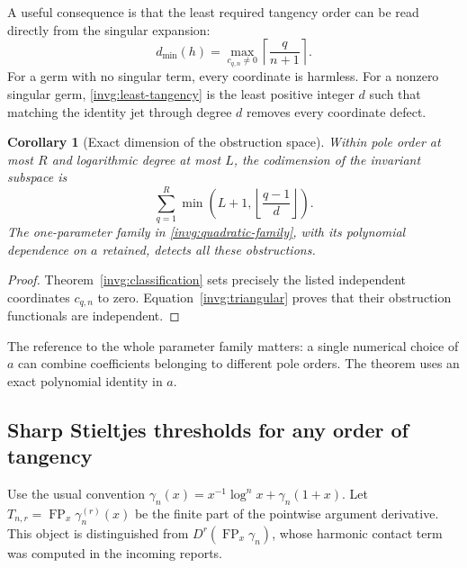 \documentclass[11pt,a4paper]{article}
\newtheorem{corollary}[theorem]{Corollary}
\theoremstyle{definition}
\theoremstyle{remark}
\numberwithin{equation}{section}
\begin{document}
A useful consequence is that the least required tangency order can be
read directly from the singular expansion:
\begin{equation}\label{invg:least-tangency}
 d_{\min}(h)=\max_{c_{q,n}\ne0}
              \left\lceil\frac q{n+1}\right\rceil.
\end{equation}
For a germ with no singular term, every coordinate is harmless.  For a
nonzero singular germ, \eqref{invg:least-tangency} is the least positive
integer $d$ such that matching the identity jet through degree $d$
removes every coordinate defect.

\begin{corollary}[Exact dimension of the obstruction space]
\label{invg:rank}
Within pole order at most $R$ and logarithmic degree at most $L$, the
codimension of the invariant subspace is
\begin{equation}\label{invg:rank-formula}
 \sum_{q=1}^{R}\min\!\left(L+1,\left\lfloor\frac{q-1}{d}\right\rfloor\right).
\end{equation}
The one-parameter family in \eqref{invg:quadratic-family}, with its
polynomial dependence on $a$ retained, detects all these obstructions.
\end{corollary}
\begin{proof}
Theorem~\ref{invg:classification} sets precisely the listed independent
coordinates $c_{q,n}$ to zero.  Equation~\eqref{invg:triangular} proves
that their obstruction functionals are independent.
\end{proof}

The reference to the whole parameter family matters: a single numerical
choice of $a$ can combine coefficients belonging to different pole orders.
The theorem uses an exact polynomial identity in $a$.

\subsection{Sharp Stieltjes thresholds for any order of tangency}

Use the usual convention
$\gamma_n(x)=x^{-1}\log^n x+\gamma_n(1+x)$.  Let
$T_{n,r}=\operatorname{FP}_x\gamma_n^{(r)}(x)$ be the finite part of
the pointwise argument derivative.  This object is distinguished from
$D^r(\operatorname{FP}_x\gamma_n)$, whose harmonic contact term was
computed in the incoming reports.
\end{document}
